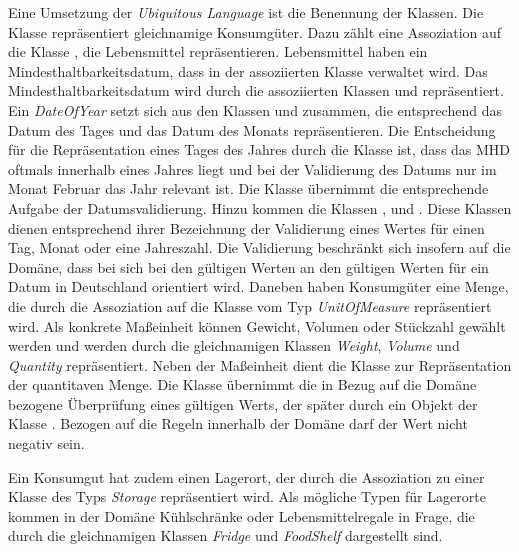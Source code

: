 Eine Umsetzung der \textit{Ubiquitous Language} ist die Benennung der Klassen.
Die Klasse \href{}{} repräsentiert gleichnamige Konsumgüter.
Dazu zählt eine Assoziation auf die Klasse \href{}{}, die Lebensmittel repräsentieren.
Lebensmittel haben ein Mindesthaltbarkeitsdatum, dass in der assoziierten Klasse \href{}{} verwaltet wird.
Das Mindesthaltbarkeitsdatum wird durch die assoziierten Klassen \href{}{} und \href{}{} repräsentiert.
Ein \textit{DateOfYear} setzt sich aus den Klassen \href{}{} und \href{}{} zusammen, die entsprechend das Datum des Tages und das Datum des Monats repräsentieren.
Die Entscheidung für die Repräsentation eines Tages des Jahres durch die Klasse \href{}{\code{}} ist, dass das MHD oftmals innerhalb eines Jahres liegt und bei der Validierung des Datums nur im Monat Februar das Jahr relevant ist.
Die Klasse \href{}{} übernimmt die entsprechende Aufgabe der Datumsvalidierung.
Hinzu kommen die Klassen \href{}{}, \href{}{} und \href{}{}.
Diese Klassen dienen entsprechend ihrer Bezeichnung der Validierung eines Wertes für einen Tag, Monat oder eine Jahreszahl.
Die Validierung beschränkt sich insofern auf die Domäne, dass bei sich bei den gültigen Werten an den gültigen Werten für ein Datum in Deutschland orientiert wird.
Daneben haben Konsumgüter eine Menge, die durch die Assoziation auf die Klasse vom Typ \href{}{\code{}}\textit{UnitOfMeasure} repräsentiert wird.
Als konkrete Maßeinheit können Gewicht, Volumen oder Stückzahl gewählt werden und werden durch die gleichnamigen Klassen \href{}{\code{}}\textit{Weight}, \href{}{\code{}}\textit{Volume} und \href{}{\code{}}\textit{Quantity} repräsentiert.
Neben der Maßeinheit dient die Klasse \href{}{} zur Repräsentation der quantitaven Menge.
Die Klasse \href{}{} übernimmt die in Bezug auf die Domäne bezogene Überprüfung eines gültigen Werts, der später durch ein Objekt der Klasse \href{}{}.
Bezogen auf die Regeln innerhalb der Domäne darf der Wert nicht negativ sein.

Ein Konsumgut hat zudem einen Lagerort, der durch die Assoziation zu einer Klasse des Typs \textit{Storage} repräsentiert wird.
Als mögliche Typen für Lagerorte kommen in der Domäne Kühlschränke oder Lebensmittelregale in Frage, die durch die gleichnamigen Klassen \textit{Fridge} und \textit{FoodShelf} dargestellt sind.


